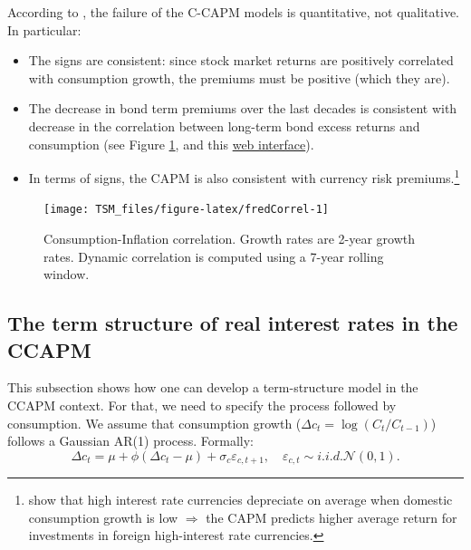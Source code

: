 \documentclass[
  12pt,
]{book}
\providecommand{\tightlist}{%
  \setlength{\itemsep}{0pt}\setlength{\parskip}{0pt}}
\theoremstyle{definition}
\theoremstyle{definition}
\theoremstyle{definition}
\theoremstyle{definition}
\theoremstyle{remark}
\begin{document}
According to \citet{Cochrane_2005}, the failure of the C-CAPM models is quantitative, not qualitative. In particular:

\begin{itemize}
\tightlist
\item
  The signs are consistent: since stock market returns are positively correlated with consumption growth, the premiums must be positive (which they are).
\item
  The decrease in bond term premiums over the last decades is consistent with decrease in the correlation between long-term bond excess returns and consumption (see Figure \ref{fig:fredCorrel}, and this \href{https://jrenne.shinyapps.io/APModels}{web interface}).
\item
  In terms of signs, the CAPM is also consistent with currency risk premiums.\footnote{\citet{Lustig_Verdelhan_2007} show that high interest rate currencies depreciate on average when domestic consumption growth is low \(\Rightarrow\) the CAPM predicts higher average return for investments in foreign high-interest rate currencies.}
\end{itemize}

\begin{figure}
\texttt{[image: TSM\_files/figure-latex/fredCorrel-1]} \caption{Consumption-Inflation correlation. Growth rates are 2-year growth rates. Dynamic correlation is computed using a 7-year rolling window.}\label{fig:fredCorrel}
\end{figure}

\hypertarget{TSCCAPM}{%
\subsection{The term structure of real interest rates in the CCAPM}\label{TSCCAPM}}

This subsection shows how one can develop a term-structure model in the CCAPM context. For that, we need to specify the process followed by consumption. We assume that consumption growth (\(\Delta c_{t}=\log (C_{t}/C_{t-1})\)) follows a Gaussian AR(1) process. Formally:
\[
\Delta c_{t} = \mu + \phi (\Delta c_t - \mu) + \sigma_c \varepsilon_{c,t+1},\quad \varepsilon_{c,t} \sim i.i.d.\mathcal{N}(0,1).
\]
\end{document}
